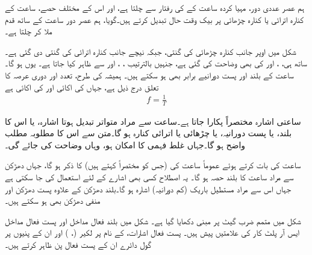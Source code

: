 ہم عصر عددی دور، مہیا کردہ  ساعت کے    کی رفتار سے چلتا ہے،  اور  اس  کے مختلف حصے،  ساعت کے کنارہ اترائی یا کنارہ چڑھائی پر بیک وقت حال تبدیل کرتے ہیں۔گویا،  ہم عصر دور ساعت کے ساتھ قدم ملا کر چلتا ہے۔


شکل     میں اوپر جانب کنارہ چڑھائی کی گنتی،  جبکہ نیچے  جانب کنارہ اترائی کی گنتی دی گئی ہے۔ساتھ ہی،   ،   اور کی بھی  وضاحت کی گئی ہے، جنہیں بالترتیب ، ، اور  سے ظاہر کیا جاتا ہے۔
یوں  ہو گا۔ ساعت کے بلند اور  پست دورانیے برابر بھی ہو سکتے ہیں۔ ہمیشہ کی طرح،  تعدد   اور   دوری عرصہ  کا تعلق   درج ذیل  ہے، جہاں  کی اکائی  اور  کی اکائی  ہے
\begin{align*}
f=\frac{1}{T}
\end{align*}

ساعتی اشارہ  مختصراً   پکارا جاتا ہے۔ساعت سے مراد متواتر تبدیل ہوتا اشارہ،  یا اس کا بلند،  یا پست دورانیہ،  یا   چڑھائی یا اترائی  کنارہ  ہو گا۔متن سے  اس کا مطلوبہ مطلب   واضح  ہو گا۔جہاں غلط فہمی کا امکان ہو،  وہاں وضاحت کی جائے گی۔

ساعت کی بات کرتے ہوئے عموماً  ساعت کی      (جس کو مختصراً  کہتے ہیں) کا ذکر ہو گا، جہاں دھڑکن سے مراد ساعت  کا  بلند حصہ ہو گا۔ یہ اصطلاح  کسی بھی اشارے کے لئے استعمال کی جا سکتی ہے جہاں اس سے مراد  مستطیل باریک (کم دورانیہ)  اشارہ ہو گا۔بلند   دھڑکن   کے علاوہ پست دھڑکن اور منفی  دھڑکن بھی ہو سکتے ہیں۔  

شکل    میں  متمم ضرب گیٹ پر مبنی    دکھایا گیا  ہے۔ شکل  میں بلند فعال مداخل  اور پست فعال مداخل  ایس آر پلٹ کار کی علامتیں پیش  ہیں۔ پست فعال اشارات، کے نام پر لکیر (، ) اور ان  کے پنیوں پر گول دائرے  ان کے پست فعال پن  ظاہر کرتے ہیں۔


